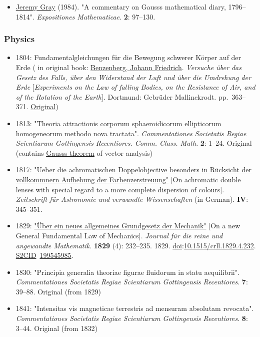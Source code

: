 \begin{itemize}
  \begin{itemize}
  \tightlist
  \item
    {\href{https://en.wikipedia.org/wiki/Jeremy_Gray_(mathematician)}{Jeremy Gray} (1984). "A commentary on Gauss\textquotesingle s mathematical diary, 1796--1814". \emph{Expositiones Mathematicae}. \textbf{2}: {97--}130.{}}
  \end{itemize}
\end{itemize}


\subsubsection{Physics}\label{Physics}

\begin{itemize}
\tightlist
\item
  {1804: Fundamentalgleichungen für die Bewegung schwerer Körper auf der Erde ( in original book: \href{https://en.wikipedia.org/wiki/Johann_Benzenberg}{Benzenberg, Johann Friedrich}. \emph{Versuche über das Gesetz des Falls, über den Widerstand der Luft und über die Umdrehung der Erde} {{[}}\emph{Experiments on the Law of falling Bodies, on the Resistance of Air, and of the Rotation of the Earth}{{]}}. Dortmund: Gebrüder Mallinckrodt. pp.{~}{363--}371.{} \href{https://www.digitale-sammlungen.de/de/view/bsb10060427?page=392,393}{Original})}
\item
  {1813: "Theoria attractionis corporum sphaeroidicorum ellipticorum homogeneorum methodo nova tractata". \emph{Commentationes Societatis Regiae Scientiarum Gottingensis Recentiores. Comm. Class. Math}. \textbf{2}: {1--}24.{} Original (contains \href{https://en.wikipedia.org/wiki/Gauss's_theorem}{Gauss\textquotesingle s theorem} of vector analysis)}
\item
  {1817: \href{https://babel.hathitrust.org/cgi/pt?id=hvd.hxigq8&seq=349}{"Ueber die achromatischen Doppelobjective besonders in Rücksicht der vollkommnern Aufhebung der Farbenzerstreuung"} {{[}}On achromatic double lenses with special regard to a more complete dispersion of colours{{]}}. \emph{Zeitschrift für Astronomie und verwandte Wissenschaften} (in German). \textbf{IV}: {345--}351.{}}
\item
  {1829: \href{https://zenodo.org/record/1448816}{"Über ein neues allgemeines Grundgesetz der Mechanik"} {{[}}On a new General Fundamental Law of Mechanics{{]}}. \emph{Journal für die reine und angewandte Mathematik}. \textbf{1829} (4): {232--}235. 1829. \href{https://en.wikipedia.org/wiki/Doi_(identifier)}{doi}:\href{https://doi.org/10.1515\%2Fcrll.1829.4.232}{10.1515/crll.1829.4.232}. \href{https://en.wikipedia.org/wiki/S2CID_(identifier)}{S2CID}{~}\href{https://api.semanticscholar.org/CorpusID:199545985}{199545985}.{}}
\item
  {1830: "Principia generalia theoriae figurae fluidorum in statu aequilibrii". \emph{Commentationes Societatis Regiae Scientiarum Gottingensis Recentiores}. \textbf{7}: {39--}88.{} Original (from 1829)}
\item
  {1841: "Intensitas vis magneticae terrestris ad mensuram absolutam revocata". \emph{Commentationes Societatis Regiae Scientiarum Gottingensis Recentiores}. \textbf{8}: {3--}44.{} Original (from 1832)}


\end{itemize}
